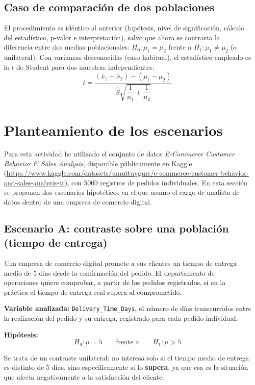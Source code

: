 \documentclass[11pt, a4paper]{article}
\begin{document}
\subsection{Caso de comparación de dos poblaciones}

El procedimiento es idéntico al anterior (hipótesis, nivel de significación, cálculo del 
estadístico, p-valor e interpretación), salvo que ahora se contrasta la diferencia entre dos 
medias poblacionales: $H_0: \mu_1 = \mu_2$ frente a $H_1: \mu_1 \neq \mu_2$ (o unilateral). 
Con varianzas desconocidas (caso habitual), el estadístico empleado es la $t$ de Student para 
dos muestras independientes:
\[
t = \frac{(\bar{x}_1 - \bar{x}_2) - (\mu_1 - \mu_2)}{\hat{S}\sqrt{\dfrac{1}{n_1} + \dfrac{1}{n_2}}}
\]


\section{Planteamiento de los escenarios}

Para esta actividad he utilizado el conjunto de datos 
\textit{E-Commerce Customer Behavior \& Sales Analysis}, disponible públicamente en Kaggle 
(\url{https://www.kaggle.com/datasets/umuttuygurr/e-commerce-customer-behavior-and-sales-analysis-tr}), 
con 5000 registros de pedidos individuales. En esta sección se proponen dos escenarios 
hipotéticos en el que asumo el cargo de analista de datos dentro de una empresa de comercio
digital.

\subsection{Escenario A: contraste sobre una población (tiempo de entrega)}

Una empresa de comercio digital promete a sus clientes un tiempo de entrega medio de 5 
días desde la confirmación del pedido. El departamento de operaciones quiere comprobar, a 
partir de los pedidos registrados, si en la práctica el tiempo de entrega real supera al 
comprometido.

\textbf{Variable analizada:} \texttt{Delivery\_Time\_Days}, el número de días transcurridos 
entre la realización del pedido y su entrega, registrado para cada pedido individual.

\textbf{Hipótesis:}
\[
H_0: \mu = 5 \qquad \text{frente a} \qquad H_1: \mu > 5
\]

Se trata de un contraste unilateral: no interesa solo si el tiempo medio de entrega es 
distinto de 5 días, sino específicamente si lo \textbf{supera}, ya que esa es la situación 
que afecta negativamente a la satisfacción del cliente.
\end{document}
